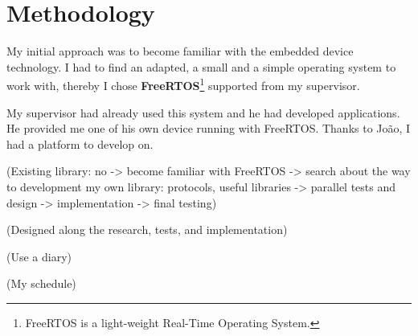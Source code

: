 \chapter{Methodology}

\hspace{15mm}My initial approach was to become familiar with the embedded device technology. I had to find an adapted, a small and a simple operating system to work with, thereby I chose \textbf{FreeRTOS}\footnote{FreeRTOS is a light-weight Real-Time Operating System.} supported from my supervisor.

My supervisor had already used this system and he had developed applications. He provided me one of his own device running with FreeRTOS. Thanks to Jo\~{a}o, I had a platform to develop on.

(Existing library: no -> become familiar with FreeRTOS -> search about the way to development my own library: protocols, useful libraries -> parallel tests and design -> implementation -> final testing)

(Designed along the research, tests, and implementation)

(Use a diary)

(My schedule)

\clearpage
